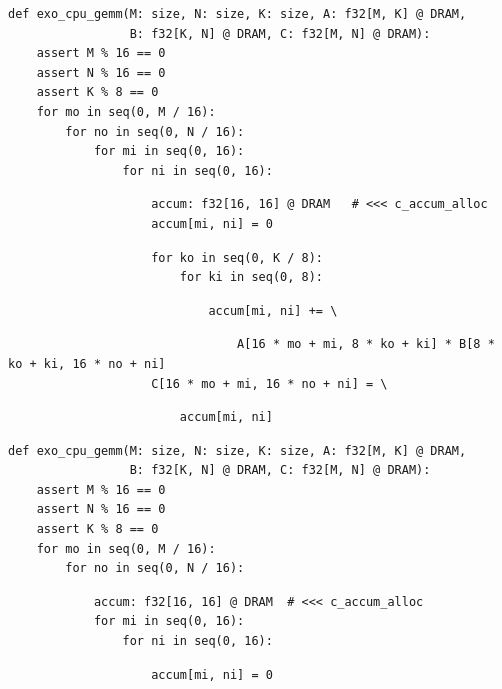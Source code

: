\begin{minipage}[t]{0.6\textwidth}\codeminipage
\tiny
\begin{verbatim}
def exo_cpu_gemm(M: size, N: size, K: size, A: f32[M, K] @ DRAM,
                 B: f32[K, N] @ DRAM, C: f32[M, N] @ DRAM):
    assert M % 16 == 0
    assert N % 16 == 0
    assert K % 8 == 0
    for mo in seq(0, M / 16):
        for no in seq(0, N / 16):
            for mi in seq(0, 16):
                for ni in seq(0, 16):
\end{verbatim}
\begin{mdframed}[style=MyFrame, backgroundcolor=yellowBoxBg]
\color{yellowBoxFg}
\begin{verbatim}
                    accum: f32[16, 16] @ DRAM   # <<< c_accum_alloc
                    accum[mi, ni] = 0
\end{verbatim}
\end{mdframed}
\begin{verbatim}
                    for ko in seq(0, K / 8):
                        for ki in seq(0, 8):
\end{verbatim}
\begin{mdframed}[style=MyFrame, backgroundcolor=yellowBoxBg]
\color{yellowBoxFg}
\begin{verbatim}
                            accum[mi, ni] += \
\end{verbatim}
\end{mdframed}
\begin{verbatim}
                                A[16 * mo + mi, 8 * ko + ki] * B[8 * ko + ki, 16 * no + ni]
                    C[16 * mo + mi, 16 * no + ni] = \
\end{verbatim}
\begin{mdframed}[style=MyFrame, backgroundcolor=yellowBoxBg]
\color{yellowBoxFg}
\begin{verbatim}
                        accum[mi, ni]
\end{verbatim}
\end{mdframed}
\vspace{5mm}
\begin{verbatim}
def exo_cpu_gemm(M: size, N: size, K: size, A: f32[M, K] @ DRAM,
                 B: f32[K, N] @ DRAM, C: f32[M, N] @ DRAM):
    assert M % 16 == 0
    assert N % 16 == 0
    assert K % 8 == 0
    for mo in seq(0, M / 16):
        for no in seq(0, N / 16):
\end{verbatim}
\begin{mdframed}[style=MyFrame, backgroundcolor=blueBoxBg]
\color{blueBoxFg}
\begin{verbatim}
            accum: f32[16, 16] @ DRAM  # <<< c_accum_alloc
            for mi in seq(0, 16):
                for ni in seq(0, 16):
\end{verbatim}
\end{mdframed}
\begin{verbatim}
                    accum[mi, ni] = 0
\end{verbatim}


\end{minipage}
